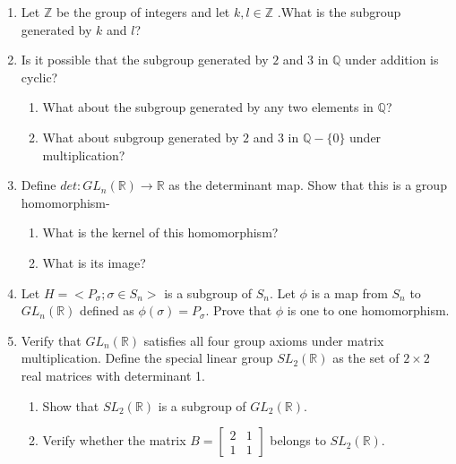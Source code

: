 \documentclass[12pt,a4paper]{article}
\begin{document}
\begin{enumerate}
\begin{enumerate}
\end{enumerate} 
\item Let  $\mathbb{Z}$ be the group of integers and let $k,l \in \mathbb{Z}$ .What is the subgroup generated by $k$ and $l$? %
\item Is  it possible that the subgroup generated by $2$ and $3$ in $\mathbb{Q}$ under addition is cyclic?
\begin{enumerate}
    \item What about the subgroup generated by any two elements in $\mathbb{Q}$?
    \item What about subgroup generated by $2$ and $3$ in $\mathbb{Q}-\{0\}$ under multiplication?  
\end{enumerate}
\item Define $det : GL_n(\mathbb R) \to \mathbb R$ as the determinant map. Show that this is a group homomorphism-

    \begin{enumerate}
        \item What is the kernel of this homomorphism?
        \item What is its image?
        \end{enumerate}
\item Let $H=< P_\sigma  ; \sigma \in S_n>$ is a subgroup of $S_n$. Let $\phi$ is a map from $S_n$ to $GL_n(\mathbb{R})$ defined as $\phi(\sigma)=P_\sigma$. Prove that $\phi$ is one to one homomorphism.
\item Verify that $GL_n(\mathbb{R})$ satisfies all four group axioms under matrix multiplication. Define the special linear group $SL_2(\mathbb{R})$ as the set of $2 \times 2$ real matrices with determinant 1.
\begin{enumerate}
    
  \item Show that $SL_2(\mathbb{R})$ is a subgroup of $GL_2(\mathbb{R})$.
  \item Verify whether the matrix $B = \begin{bmatrix} 2 & 1 \\ 1 & 1 \end{bmatrix}$ belongs to $SL_2(\mathbb{R})$.
  
\end{enumerate} 
\end{enumerate}
\end{document}
